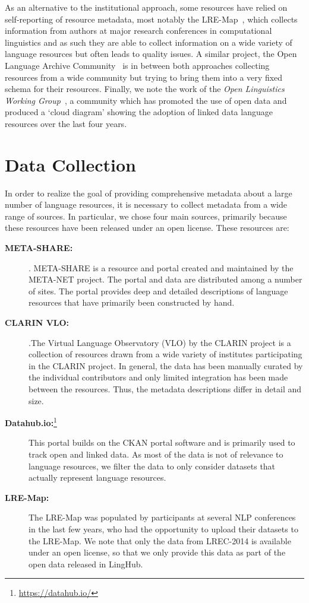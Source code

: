 \documentclass[smallextended]{svjour3}       %
\begin{document}
As an alternative to the institutional approach, some resources have relied on
self-reporting of resource metadata, most notably the
LRE-Map~\cite{calzolari2012lre}, which collects information from authors at
major research conferences in computational linguistics and as such they are
able to collect information on a wide variety of language resources but often
leads to quality issues. A similar project, the Open Language Archive
Community~\cite[OLAC]{piperidis2012meta} is in between both approaches collecting
resources from a wide community but trying to bring them into a very fixed
schema for their resources. Finally, we note the work of the \emph{Open
Linguistics Working Group}~\cite{chiarcos2012open}, a community which has
promoted the use of open data and produced a `cloud diagram' showing the
adoption of linked data language resources over the last four years.


\section{Data Collection}
\label{data-collection}

In order to realize the goal of providing comprehensive metadata about a large 
number of language
resources, it is necessary to collect metadata from a wide range of sources. In
particular, we chose four main sources, primarily because these resources have
been released under an open license. These resources are:

\begin{description}
    \item[\textbf{META-SHARE:}]. META-SHARE is a resource and portal created and
        maintained by the META-NET project. The portal and data are distributed
        among a number of sites. The portal
        provides deep and detailed descriptions of language resources that have
        primarily been constructed by hand.
    \item[\textbf{CLARIN VLO:}].The Virtual Language Observatory (VLO) by the CLARIN
        project is a collection of resources drawn from a wide variety of
        institutes participating in the CLARIN project. In general, the data has been
        manually curated by the individual contributors and only limited
        integration has been made between the resources. Thus, the metadata descriptions differ in detail and size.
    \item[\textbf{Datahub.io:}\footnote{\url{https://datahub.io/}}] This portal
        builds on the CKAN portal software and is primarily used to track 
        open and linked data. As most of the data is not of relevance to language
        resources, we filter the data to only consider datasets that actually represent language resources.
    \item[\textbf{LRE-Map:}] The LRE-Map was populated by participants at several
        NLP conferences in the last few years, who had the opportunity to upload
        their datasets to the LRE-Map. We note that only the data from LREC-2014
        is available under an open license, so that we only provide this data as
        part of the open data released in LingHub. 
\end{description}
\end{document}
